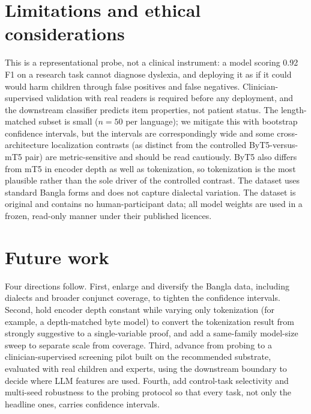 \documentclass[preprint,12pt]{elsarticle}
\begin{document}
\section{Limitations and ethical considerations}
\label{sec:limits}
This is a representational probe, not a clinical instrument: a model scoring 0.92 F1 on a research task cannot diagnose dyslexia, and deploying it as if it could would harm children through false positives and false negatives. Clinician-supervised validation with real readers is required before any deployment, and the downstream classifier predicts item properties, not patient status. The length-matched subset is small ($n=50$ per language); we mitigate this with bootstrap confidence intervals, but the intervals are correspondingly wide and some cross-architecture localization contrasts (as distinct from the controlled ByT5-versus-mT5 pair) are metric-sensitive and should be read cautiously. ByT5 also differs from mT5 in encoder depth as well as tokenization, so tokenization is the most plausible rather than the sole driver of the controlled contrast. The dataset uses standard Bangla forms and does not capture dialectal variation. The dataset is original and contains no human-participant data; all model weights are used in a frozen, read-only manner under their published licences.

\section{Future work}
\label{sec:future}
Four directions follow. First, enlarge and diversify the Bangla data, including dialects and broader conjunct coverage, to tighten the confidence intervals. Second, hold encoder depth constant while varying only tokenization (for example, a depth-matched byte model) to convert the tokenization result from strongly suggestive to a single-variable proof, and add a same-family model-size sweep to separate scale from coverage. Third, advance from probing to a clinician-supervised screening pilot built on the recommended substrate, evaluated with real children and experts, using the downstream boundary to decide where LLM features are used. Fourth, add control-task selectivity and multi-seed robustness to the probing protocol so that every task, not only the headline ones, carries confidence intervals.

\end{document}
